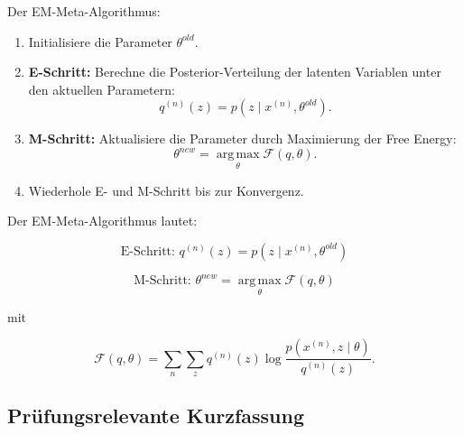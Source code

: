 \documentclass[11pt,a4paper]{scrartcl}
\begin{document}
\begin{solutionbox}
    Der EM-Meta-Algorithmus:

    \begin{enumerate}
        \item Initialisiere die Parameter \(\theta^{old}\).

        \item \textbf{E-Schritt:}
        Berechne die Posterior-Verteilung der latenten Variablen unter den
        aktuellen Parametern:
        \[
            q^{(n)}(z)
            =
            p(z\mid x^{(n)},\theta^{old}).
        \]

        \item \textbf{M-Schritt:}
        Aktualisiere die Parameter durch Maximierung der Free Energy:
        \[
            \theta^{new}
            =
            \operatorname*{arg\,max}_{\theta}
            \mathcal{F}(q,\theta).
        \]

        \item Wiederhole E- und M-Schritt bis zur Konvergenz.
    \end{enumerate}
\end{solutionbox}

\begin{answerbox}
    Der EM-Meta-Algorithmus lautet:

    \[
        \boxed{
            \text{E-Schritt: }
            q^{(n)}(z)
            =
            p(z\mid x^{(n)},\theta^{old})
        }
    \]

    \[
        \boxed{
            \text{M-Schritt: }
            \theta^{new}
            =
            \operatorname*{arg\,max}_{\theta}
            \mathcal{F}(q,\theta)
        }
    \]

    mit

    \[
        \boxed{
            \mathcal{F}(q,\theta)
            =
            \sum_{n}
            \sum_z
            q^{(n)}(z)
            \log
            \frac{
                p(x^{(n)},z\mid \theta)
            }{
                q^{(n)}(z)
            }
        }.
    \]
\end{answerbox}

\subsection{Prüfungsrelevante Kurzfassung}
\end{document}
